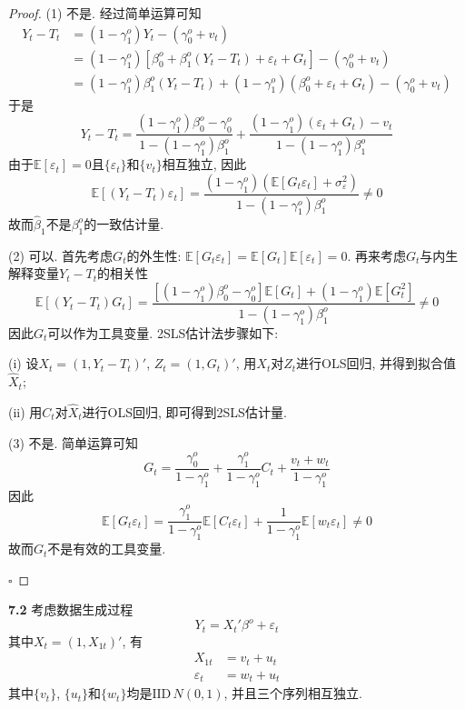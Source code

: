 \documentclass[cn,12pt,math=mtpro2,citestyle=gb7714-2015,bibstyle=gb7714-2015,twocol,mode=simple]{elegantbook}
\newcommand{\E}{\mathbb{E}}
\newcommand{\hbeta}{\hat{\beta}}
\begin{document}
\begin{proof}
  (1) 不是. 经过简单运算可知
  \begin{align*}
  Y_t-T_t&=(1-\gamma_1^o)Y_t-(\gamma_0^o+v_t) \\
  &=(1-\gamma_1^o)[\beta_0^o+\beta_1^o(Y_t-T_t)+\varepsilon_t+G_t]-(\gamma_0^o+v_t) \\
  &=(1-\gamma_1^o)\beta_1^o(Y_t-T_t)+(1-\gamma_1^o)(\beta_0^o+\varepsilon_t+G_t)-(\gamma_0^o+v_t)
  \end{align*}
  于是
  $$Y_t-T_t=\frac{(1-\gamma_1^o)\beta_0^o-\gamma_0^o}{1-(1-\gamma_1^o)\beta_1^o}+\frac{(1-\gamma_1^o)(\varepsilon_t+G_t)-v_t}{1-(1-\gamma_1^o)\beta_1^o}$$
  由于$\E[\varepsilon_t]=0$且$\{\varepsilon_t\}$和$\{v_t\}$相互独立, 因此
  $$\E[(Y_t-T_t)\varepsilon_t]=\frac{(1-\gamma_1^o)(\E[G_t\varepsilon_t]+\sigma_\varepsilon^2)}{1-(1-\gamma_1^o)\beta_1^o}\neq 0$$
  故而$\hbeta_1$不是$\beta_1^o$的一致估计量.

  (2) 可以. 首先考虑$G_t$的外生性: $\E[G_t\varepsilon_t]=\E[G_t]\E[\varepsilon_t]=0$. 再来考虑$G_t$与内生解释变量$Y_t-T_t$的相关性
  $$\E[(Y_t-T_t)G_t]=\frac{[(1-\gamma_1^o)\beta_0^o-\gamma_0^o]\E[G_t]+(1-\gamma_1^o)\E[G_t^2]}{1-(1-\gamma_1^o)\beta_1^o}\neq0$$
  因此$G_t$可以作为工具变量. 2SLS估计法步骤如下:

  (i) 设$X_t=(1,Y_t-T_t)'$, $Z_t=(1,G_t)'$, 用$X_t$对$Z_t$进行OLS回归, 并得到拟合值$\hat{X}_t$;

  (ii) 用$C_t$对$\hat{X}_t$进行OLS回归, 即可得到2SLS估计量.

  (3) 不是. 简单运算可知
$$G_t=\frac{\gamma_0^o}{1-\gamma_1^o}+\frac{\gamma_1^o}{1-\gamma_1^o}C_t+\frac{v_t+w_t}{1-\gamma_1^o}$$
因此
$$\E[G_t\varepsilon_t]=\frac{\gamma_1^o}{1-\gamma_1^o}\E[C_t\varepsilon_t]+\frac{1}{1-\gamma_1^o}\E[w_t\varepsilon_t]\neq0$$
故而$G_t$不是有效的工具变量.

 $\square$

\end{proof}

\textbf{7.2} 考虑数据生成过程
\begin{equation}\label{eq7.2.1}
  Y_t=X_t'\beta^o+\varepsilon_t \tag{7.2.1}
\end{equation}
其中$X_t=(1,X_{1t})'$, 有
\begin{align}
X_{1t}&=v_t+u_t \label{eq7.2.2} \tag{7.2.2} \\
\varepsilon_t&=w_t+u_t \label{eq7.2.3} \tag{7.2.3}
\end{align}
其中$\{v_t\}$, $\{u_t\}$和$\{w_t\}$均是$\text{IID}\,N(0,1)$, 并且三个序列相互独立.
\end{document}
